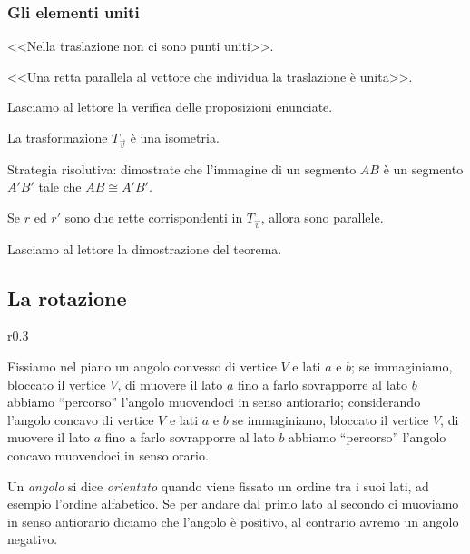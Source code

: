 
\subsubsection{Gli elementi uniti}

\begin{itemize*}
\item <<Nella traslazione non ci sono punti uniti>>.
\item <<Una retta parallela al vettore che individua la traslazione è 
unita>>.
\end{itemize*}

Lasciamo al lettore la verifica delle proposizioni enunciate.

\begin{teorema}
La trasformazione $T_{\vec{v}}$ è una isometria.
\end{teorema}

Strategia risolutiva: dimostrate che l'immagine di un segmento $AB$ è 
un segmento $A'B'$ tale che $AB\cong A'B'$.

\begin{teorema}
Se $r$ ed $r'$ sono due rette corrispondenti in $T_{\vec{v}}$, allora 
sono parallele.
\end{teorema}

Lasciamo al lettore la dimostrazione del teorema.

\subsection{La rotazione}

\setlength{\intextsep}{3pt plus 2.0pt minus 2.0pt}
\begin{wrapfigure}{r}{0.3\textwidth}
  \centering
\end{wrapfigure}
Fissiamo nel piano un angolo convesso di vertice $V$ e lati $a$ e 
$b$; se immaginiamo, bloccato il vertice $V$, di muovere il lato $a$ 
fino a farlo sovrapporre al lato $b$ abbiamo ``percorso'' l'angolo 
muovendoci in senso antiorario; considerando l'angolo concavo di 
vertice $V$ e lati $a$ e $b$ se immaginiamo, bloccato il vertice $V$, 
di muovere il lato $a$ fino a farlo sovrapporre al lato $b$ abbiamo 
``percorso'' l'angolo concavo muovendoci in senso orario.

\begin{definizione}
Un \emph{angolo} si dice \emph{orientato} quando viene fissato un 
ordine tra i suoi lati, ad esempio l'ordine alfabetico. Se per andare 
dal primo lato al secondo ci muoviamo in senso antiorario diciamo che 
l'angolo è positivo, al contrario avremo un angolo negativo.
\end{definizione}


